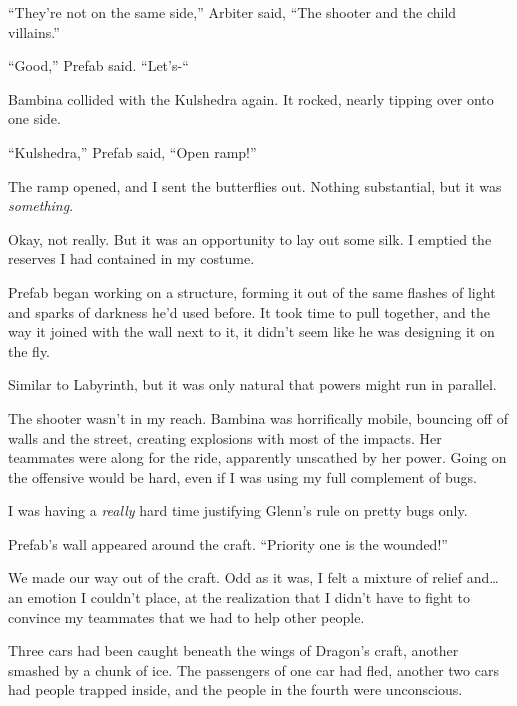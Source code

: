 ``They're not on the same side,'' Arbiter said, ``The shooter and the child villains.''



``Good,'' Prefab said.  ``Let's-``



Bambina collided with the Kulshedra again.  It rocked, nearly tipping over onto one side.



``Kulshedra,'' Prefab said, ``Open ramp!''



The ramp opened, and I sent the butterflies out.  Nothing substantial, but it was \emph{something}.



Okay, not really.  But it was an opportunity to lay out some silk.  I emptied the reserves I had contained in my costume.



Prefab began working on a structure, forming it out of the same flashes of light and sparks of darkness he'd used before.  It took time to pull together, and the way it joined with the wall next to it, it didn't seem like he was designing it on the fly.



Similar to Labyrinth, but it was only natural that powers might run in parallel.



The shooter wasn't in my reach.  Bambina was horrifically mobile, bouncing off of walls and the street, creating explosions with most of the impacts.  Her teammates were along for the ride, apparently unscathed by her power.  Going on the offensive would be hard, even if I was using my full complement of bugs.



I was having a \emph{really} hard time justifying Glenn's rule on pretty bugs only.



Prefab's wall appeared around the craft.  ``Priority one is the wounded!''



We made our way out of the craft.  Odd as it was, I felt a mixture of relief and\ldots an emotion I couldn't place, at the realization that I didn't have to fight to convince my teammates that we had to help other people.



Three cars had been caught beneath the wings of Dragon's craft, another smashed by a chunk of ice.  The passengers of one car had fled, another two cars had people trapped inside, and the people in the fourth were unconscious.



